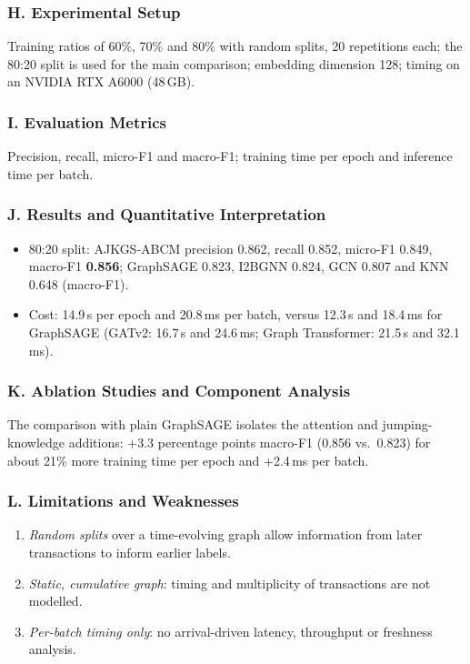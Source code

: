 \documentclass[11pt,a4paper]{article}
\begin{document}
\subsubsection*{H. Experimental Setup}
Training ratios of 60\%, 70\% and 80\% with random splits, 20 repetitions each; the 80:20 split is used for the main comparison; embedding dimension 128; timing on an NVIDIA RTX A6000 (48\,GB).

\subsubsection*{I. Evaluation Metrics}
Precision, recall, micro-F1 and macro-F1; training time per epoch and inference time per batch.

\subsubsection*{J. Results and Quantitative Interpretation}
\begin{itemize}[leftmargin=*]
    \item 80:20 split: AJKGS-ABCM precision 0.862, recall 0.852, micro-F1 0.849, macro-F1 \textbf{0.856}; GraphSAGE 0.823, I2BGNN 0.824, GCN 0.807 and KNN 0.648 (macro-F1).
    \item Cost: 14.9\,s per epoch and 20.8\,ms per batch, versus 12.3\,s and 18.4\,ms for GraphSAGE (GATv2: 16.7\,s and 24.6\,ms; Graph Transformer: 21.5\,s and 32.1\,ms).
\end{itemize}

\subsubsection*{K. Ablation Studies and Component Analysis}
The comparison with plain GraphSAGE isolates the attention and jumping-knowledge additions: +3.3 percentage points macro-F1 (0.856 vs.\ 0.823) for about 21\% more training time per epoch and +2.4\,ms per batch.

\subsubsection*{L. Limitations and Weaknesses}
\begin{enumerate}[leftmargin=*]
    \item \textit{Random splits} over a time-evolving graph allow information from later transactions to inform earlier labels.
    \item \textit{Static, cumulative graph}: timing and multiplicity of transactions are not modelled.
    \item \textit{Per-batch timing only}: no arrival-driven latency, throughput or freshness analysis.
\end{enumerate}
\end{document}
